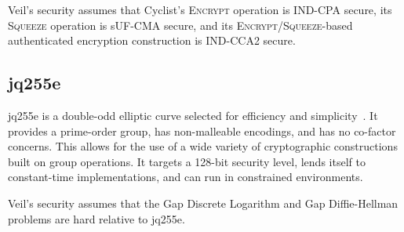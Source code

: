 Veil's security assumes that Cyclist's \textsc{Encrypt} operation is IND-CPA secure, its
\textsc{Squeeze} operation is sUF-CMA secure, and its
\textsc{Encrypt}/\textsc{Squeeze}-based authenticated encryption construction is IND-CCA2 secure.

\subsection{jq255e}\label{subsec:jq255e}

jq255e is a double-odd elliptic curve selected for efficiency and
simplicity~\cite{pornin2020do,pornin2022}\@.
It provides a prime-order group, has non-malleable encodings, and has no co-factor concerns.
This allows for the use of a wide variety of cryptographic constructions built on group operations.
It targets a 128-bit security level, lends itself to constant-time implementations, and can run in
constrained environments.

Veil's security assumes that the Gap Discrete Logarithm and Gap Diffie-Hellman problems are hard
relative to jq255e.
